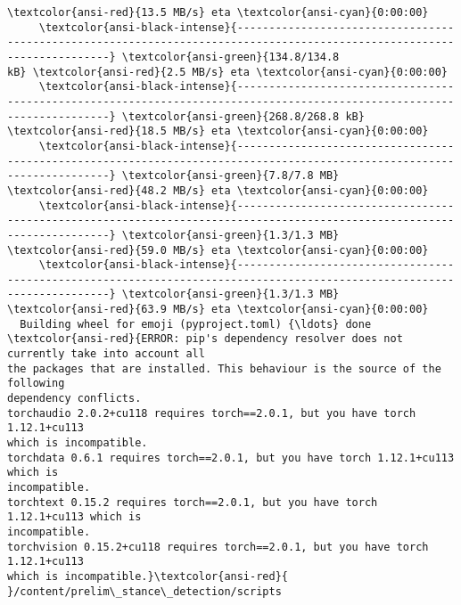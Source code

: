 \documentclass[11pt]{article}
\begin{document}
\begin{Verbatim}[commandchars=\\\{\}]
\textcolor{ansi-red}{13.5 MB/s} eta \textcolor{ansi-cyan}{0:00:00}
     \textcolor{ansi-black-intense}{------------------------------------------------------------------------------------------------------------------------} \textcolor{ansi-green}{134.8/134.8
kB} \textcolor{ansi-red}{2.5 MB/s} eta \textcolor{ansi-cyan}{0:00:00}
     \textcolor{ansi-black-intense}{------------------------------------------------------------------------------------------------------------------------} \textcolor{ansi-green}{268.8/268.8 kB}
\textcolor{ansi-red}{18.5 MB/s} eta \textcolor{ansi-cyan}{0:00:00}
     \textcolor{ansi-black-intense}{------------------------------------------------------------------------------------------------------------------------} \textcolor{ansi-green}{7.8/7.8 MB}
\textcolor{ansi-red}{48.2 MB/s} eta \textcolor{ansi-cyan}{0:00:00}
     \textcolor{ansi-black-intense}{------------------------------------------------------------------------------------------------------------------------} \textcolor{ansi-green}{1.3/1.3 MB}
\textcolor{ansi-red}{59.0 MB/s} eta \textcolor{ansi-cyan}{0:00:00}
     \textcolor{ansi-black-intense}{------------------------------------------------------------------------------------------------------------------------} \textcolor{ansi-green}{1.3/1.3 MB}
\textcolor{ansi-red}{63.9 MB/s} eta \textcolor{ansi-cyan}{0:00:00}
  Building wheel for emoji (pyproject.toml) {\ldots} done
\textcolor{ansi-red}{ERROR: pip's dependency resolver does not currently take into account all
the packages that are installed. This behaviour is the source of the following
dependency conflicts.
torchaudio 2.0.2+cu118 requires torch==2.0.1, but you have torch 1.12.1+cu113
which is incompatible.
torchdata 0.6.1 requires torch==2.0.1, but you have torch 1.12.1+cu113 which is
incompatible.
torchtext 0.15.2 requires torch==2.0.1, but you have torch 1.12.1+cu113 which is
incompatible.
torchvision 0.15.2+cu118 requires torch==2.0.1, but you have torch 1.12.1+cu113
which is incompatible.}\textcolor{ansi-red}{
}/content/prelim\_stance\_detection/scripts
    \end{Verbatim}
\end{document}
